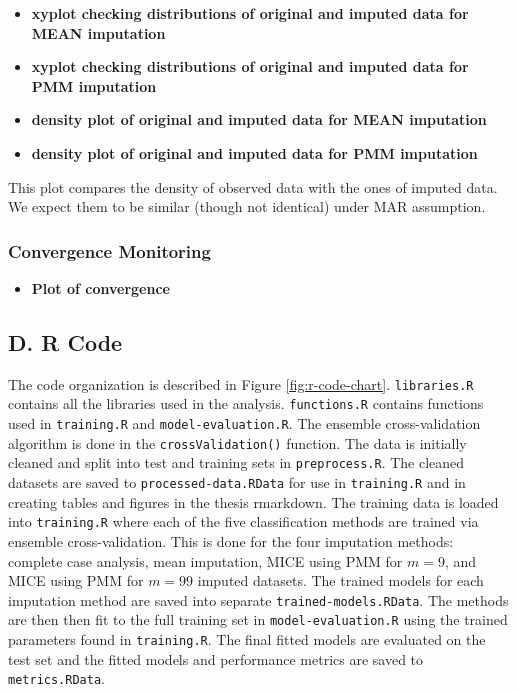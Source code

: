 \documentclass[12pt,]{article}
\providecommand{\tightlist}{%
  \setlength{\itemsep}{0pt}\setlength{\parskip}{0pt}}
\begin{document}
\begin{itemize}
\item
  \textbf{xyplot checking distributions of original and imputed data for
  MEAN imputation}
\item
  \textbf{xyplot checking distributions of original and imputed data for
  PMM imputation}
\item
  \textbf{density plot of original and imputed data for MEAN imputation}
\item
  \textbf{density plot of original and imputed data for PMM imputation}
\end{itemize}

This plot compares the density of observed data with the ones of imputed
data. We expect them to be similar (though not identical) under MAR
assumption.

\subsubsection{Convergence Monitoring}\label{convergence-monitoring}

\begin{itemize}
\tightlist
\item
  \textbf{Plot of convergence}
\end{itemize}

\subsection{D. R Code}\label{d.-r-code}

The code organization is described in Figure \ref{fig:r-code-chart}.
\texttt{libraries.R} contains all the libraries used in the analysis.
\texttt{functions.R} contains functions used in \texttt{training.R} and
\texttt{model-evaluation.R}. The ensemble cross-validation algorithm is
done in the \texttt{crossValidation()} function. The data is initially
cleaned and split into test and training sets in \texttt{preprocess.R}.
The cleaned datasets are saved to \texttt{processed-data.RData} for use
in \texttt{training.R} and in creating tables and figures in the thesis
rmarkdown. The training data is loaded into \texttt{training.R} where
each of the five classification methods are trained via ensemble
cross-validation. This is done for the four imputation methods: complete
case analysis, mean imputation, MICE using PMM for \(m=9\), and MICE
using PMM for \(m=99\) imputed datasets. The trained models for each
imputation method are saved into separate \texttt{trained-models.RData}.
The methods are then then fit to the full training set in
\texttt{model-evaluation.R} using the trained parameters found in
\texttt{training.R}. The final fitted models are evaluated on the test
set and the fitted models and performance metrics are saved to
\texttt{metrics.RData}.
\end{document}
